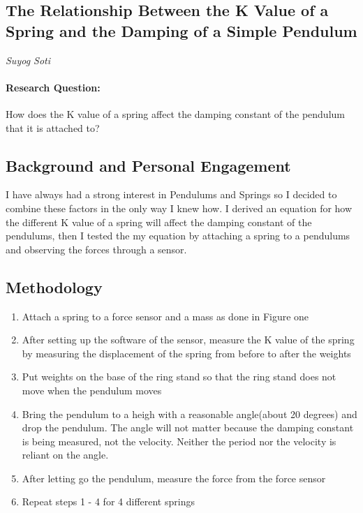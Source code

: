 \documentclass{report}
\begin{document}
\begin{center}
\section*{The Relationship Between the K Value of a Spring and the Damping of a Simple Pendulum}
\textit{Suyog Soti}
\end{center}

\paragraph{Research Question:} How does the K value of a spring affect the damping constant of the pendulum that it is attached to?

\subsection*{Background and Personal Engagement}
\indent I have always had a strong interest in Pendulums and Springs so I decided to combine these factors in the only way I knew how. I derived an equation for how the different K value of a spring will affect the damping constant of the pendulums, then I tested the my equation by attaching a spring to a pendulums and observing the forces through a sensor. 

\subsection*{Methodology}
\begin{enumerate}
\item Attach a spring to a force sensor and a mass as done in Figure one
\item After setting up the software of the sensor, measure the K value of the spring by measuring the displacement of the spring from before to after the weights
\item Put weights on the base of the ring stand so that the ring stand does not move when the pendulum moves
\item Bring the pendulum to a heigh with a reasonable angle(about 20 degrees) and drop the pendulum. The angle will not matter because the damping constant is being measured, not the velocity. Neither the period nor the velocity is reliant on the angle.
\item After letting go the pendulum, measure the force from the force sensor
\item Repeat steps 1 - 4 for 4 different springs
\end{enumerate}
\end{document}
